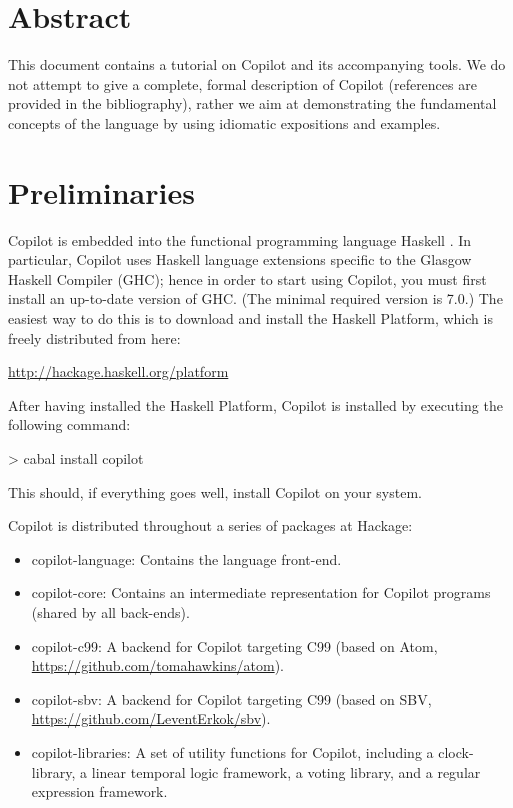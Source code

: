 \documentclass[]{article}
\theoremstyle{example}
\begin{document}
\vspace{0.25cm}

\section*{Abstract}

{
\small
This document contains a tutorial on Copilot and its accompanying tools.
We do not attempt to give a complete, formal description of Copilot
(references are provided in the bibliography), rather we aim at
demonstrating the fundamental concepts of the language by using idiomatic
expositions and examples.
}

{
\small
\setcounter{tocdepth}{2}
\tableofcontents
}

\newpage

\section{Preliminaries}

Copilot is embedded into the functional programming language Haskell
\citep{PeytonJones02}. In particular, Copilot uses Haskell language extensions
specific to the Glasgow Haskell Compiler (GHC); hence in order to start
using Copilot, you must first install an up-to-date version of GHC.
(The minimal required version is 7.0.)
The easiest way to do this is to download and install the Haskell Platform,
which is freely distributed from here:

\begin{center}
\url{http://hackage.haskell.org/platform}
\end{center}

\noindent After having installed the Haskell Platform, Copilot is installed by executing
the following command:

\begin{code}
> cabal install copilot
\end{code}

\noindent This should, if everything goes well, install Copilot on your system.

Copilot is distributed throughout a series of packages at Hackage:

\begin{itemize}
\item copilot-language: Contains the language front-end.
\item copilot-core: Contains an intermediate representation for Copilot programs (shared by all back-ends).
\item copilot-c99: A backend for Copilot targeting C99 (based on Atom, \url{https://github.com/tomahawkins/atom}).
\item copilot-sbv: A backend for Copilot targeting C99 (based on SBV, \url{https://github.com/LeventErkok/sbv}).
\item copilot-libraries: A set of utility functions for Copilot, including a clock-library, a linear temporal logic framework,
a voting library, and a regular expression framework.
\end{itemize}
\end{document}
